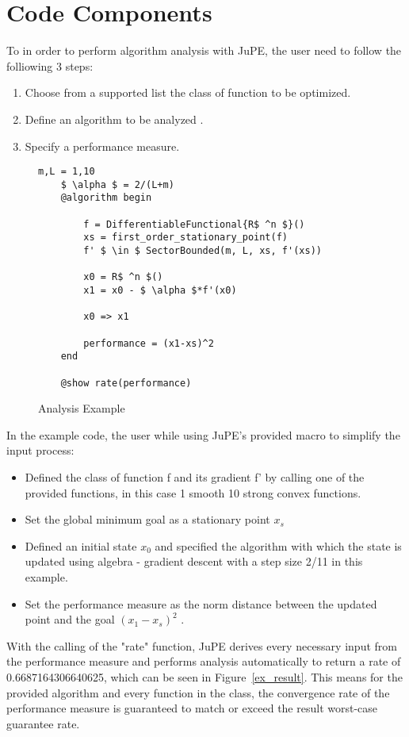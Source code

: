 \chapter{Code Components}

To in order to perform algorithm analysis with JuPE, the user need to follow the folliowing 3 steps:
\begin{enumerate}
	\item Choose from a supported list the class of function to be optimized.
	\item Define an algorithm to be analyzed .
	\item Specify a performance measure.
  \end{enumerate}
 
\begin{figure}[hbtp]
    \caption{Analysis Example}
    \label{ex_analysis}
	\begin{lstlisting}[mathescape]
	m,L = 1,10
	$ \alpha $ = 2/(L+m)
	@algorithm begin

		f = DifferentiableFunctional{R$ ^n $}()
		xs = first_order_stationary_point(f)
		f' $ \in $ SectorBounded(m, L, xs, f'(xs))

		x0 = R$ ^n $()
		x1 = x0 - $ \alpha $*f'(x0)

		x0 => x1

		performance = (x1-xs)^2
	end

	@show rate(performance)
\end{lstlisting}
\end{figure}

In the example code, the user while using JuPE's provided macro to simplify the input process:
\begin{itemize}
	\item Defined the class of function f and its gradient f' by calling one of the provided functions, in this case 1 smooth 10 strong convex functions.
	\item Set the global minimum goal as a stationary point $ x_s $
	\item Defined an initial state $ x_0 $ and specified the algorithm with which the state is updated using algebra - gradient descent with a step size 2/11 in this example.
	\item Set the performance measure as the norm distance between the updated point and the goal $ (x_1 - x_s)^2 $ .
\end{itemize}

With the calling of the "rate" function, JuPE derives every necessary input from the performance measure and performs analysis automatically to return a rate of 0.6687164306640625, which can be seen in Figure~\ref{ex_result}. This means for the provided algorithm and every function in the class, the convergence rate of the performance measure is guaranteed to match or exceed the result worst-case guarantee rate.
 
